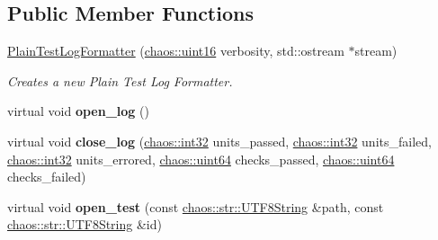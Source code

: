 \subsection*{Public Member Functions}
\begin{DoxyCompactItemize}
\item 
\hypertarget{classchaos_1_1test_1_1log__formatter_1_1_plain_test_log_formatter_a96214486917fda902ddaef37342c0ad8}{}\hyperlink{classchaos_1_1test_1_1log__formatter_1_1_plain_test_log_formatter_a96214486917fda902ddaef37342c0ad8}{Plain\+Test\+Log\+Formatter} (\hyperlink{namespacechaos_ac3888b1c9e56da7fbbdb3ab8425b4068}{chaos\+::uint16} verbosity, std\+::ostream $\ast$stream)\label{classchaos_1_1test_1_1log__formatter_1_1_plain_test_log_formatter_a96214486917fda902ddaef37342c0ad8}

\begin{DoxyCompactList}\small\item\em Creates a new Plain Test Log Formatter. \end{DoxyCompactList}\item 
\hypertarget{classchaos_1_1test_1_1log__formatter_1_1_plain_test_log_formatter_abdf1f9a1a7099f1af520b6dcc9c344b1}{}virtual void {\bfseries open\+\_\+log} ()\label{classchaos_1_1test_1_1log__formatter_1_1_plain_test_log_formatter_abdf1f9a1a7099f1af520b6dcc9c344b1}

\item 
\hypertarget{classchaos_1_1test_1_1log__formatter_1_1_plain_test_log_formatter_a6d555eeefe2db4feacd5c7652e9958bb}{}virtual void {\bfseries close\+\_\+log} (\hyperlink{namespacechaos_ad1de7efb430365afd2c9446a0f522a90}{chaos\+::int32} units\+\_\+passed, \hyperlink{namespacechaos_ad1de7efb430365afd2c9446a0f522a90}{chaos\+::int32} units\+\_\+failed, \hyperlink{namespacechaos_ad1de7efb430365afd2c9446a0f522a90}{chaos\+::int32} units\+\_\+errored, \hyperlink{namespacechaos_a34fe5f5bfc3ef6d80b5d094ed91b4d6e}{chaos\+::uint64} checks\+\_\+passed, \hyperlink{namespacechaos_a34fe5f5bfc3ef6d80b5d094ed91b4d6e}{chaos\+::uint64} checks\+\_\+failed)\label{classchaos_1_1test_1_1log__formatter_1_1_plain_test_log_formatter_a6d555eeefe2db4feacd5c7652e9958bb}

\item 
\hypertarget{classchaos_1_1test_1_1log__formatter_1_1_plain_test_log_formatter_ae1e5cce2f2e5407cd619855c3daf18a8}{}virtual void {\bfseries open\+\_\+test} (const \hyperlink{classchaos_1_1str_1_1_u_t_f8_string}{chaos\+::str\+::\+U\+T\+F8\+String} \&path, const \hyperlink{classchaos_1_1str_1_1_u_t_f8_string}{chaos\+::str\+::\+U\+T\+F8\+String} \&id)\label{classchaos_1_1test_1_1log__formatter_1_1_plain_test_log_formatter_ae1e5cce2f2e5407cd619855c3daf18a8}


\end{DoxyCompactItemize}
